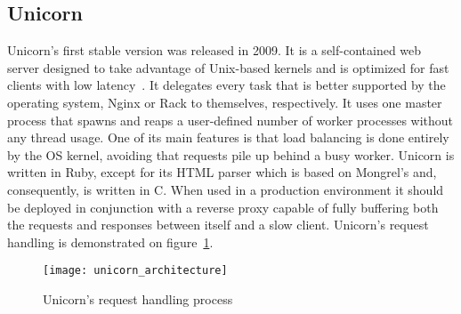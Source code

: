 \subsection{Unicorn}
Unicorn's first stable version was released in 2009. It is a self-contained web server designed to take advantage of Unix-based kernels and is optimized for fast clients with low latency~\cite{unicorn}. It delegates every task that is better supported by the operating system, Nginx or Rack to themselves, respectively. It uses one master process that spawns and reaps a user-defined number of worker processes without any thread usage. One of its main features is that load balancing is done entirely by the OS kernel, avoiding that requests pile up behind a busy worker. Unicorn is written in Ruby, except for its HTML parser which is based on Mongrel's and, consequently, is written in C. When used in a production environment it should be deployed in conjunction with a reverse proxy capable of fully buffering both the requests and responses between itself and a slow client.
Unicorn's request handling is demonstrated on figure~\ref{fig:unicorn_architecture}.
\begin{figure}[h!]
  \centering
    \texttt{[image: unicorn\_architecture]}
  \caption{Unicorn's request handling process}
  \label{fig:unicorn_architecture}
\end{figure}
